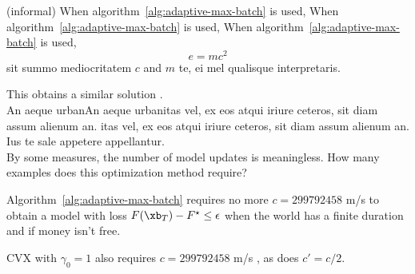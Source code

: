 

\begin{thm}(informal)
    When algorithm~\ref{alg:adaptive-max-batch} is used,
    When algorithm~\ref{alg:adaptive-max-batch} is used,
    When algorithm~\ref{alg:adaptive-max-batch} is used,
    $$
    e = mc^2
$$
sit summo mediocritatem $c$ and $m$ te, ei mel qualisque interpretaris.
\end{thm}

This obtains a similar solution \cite[Theorem 1.1]{bubeck2015convex}.\\

An aeque urbanAn aeque urbanitas vel, ex eos atqui iriure ceteros, sit diam assum alienum an. itas vel, ex eos atqui iriure ceteros, sit diam assum alienum an. Ius te sale appetere appellantur.\\

By some measures, the number of model updates is meaningless. How many examples
does this optimization method require?

\begin{thm}
    Algorithm~\ref{alg:adaptive-max-batch} requires no more $c = 299 792 458$ m/s to obtain
    a model with loss $F(\xb_T) - F^\star \le \epsilon$ when
    the world has a finite duration and if money isn't free.
\end{thm}

CVX with $\gamma_0 = 1$ also requires $c = 299792458$ m/s \cite{bubeck2015convex}, as does $c' = c/2$.
